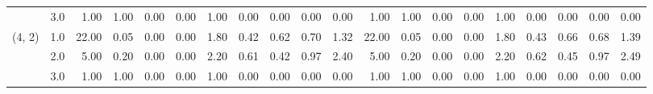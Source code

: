 \begin{tabular}{llrrrrrrrrrrrrrrrrrr}
       & 3.0 &               1.00 &                     1.00 &                                 0.00 &                             0.00 &                           1.00 &                                               0.00 &                                            0.00 &                                            0.00 &                                        0.00 &               1.00 &                     1.00 &                                 0.00 &                             0.00 &                           1.00 &                                               0.00 &                                            0.00 &                                            0.00 &                                        0.00 \\
(4, 2) & 1.0 &              22.00 &                     0.05 &                                 0.00 &                             0.00 &                           1.80 &                                               0.42 &                                            0.62 &                                            0.70 &                                        1.32 &              22.00 &                     0.05 &                                 0.00 &                             0.00 &                           1.80 &                                               0.43 &                                            0.66 &                                            0.68 &                                        1.39 \\
       & 2.0 &               5.00 &                     0.20 &                                 0.00 &                             0.00 &                           2.20 &                                               0.61 &                                            0.42 &                                            0.97 &                                        2.40 &               5.00 &                     0.20 &                                 0.00 &                             0.00 &                           2.20 &                                               0.62 &                                            0.45 &                                            0.97 &                                        2.49 \\
       & 3.0 &               1.00 &                     1.00 &                                 0.00 &                             0.00 &                           1.00 &                                               0.00 &                                            0.00 &                                            0.00 &                                        0.00 &               1.00 &                     1.00 &                                 0.00 &                             0.00 &                           1.00 &                                               0.00 &                                            0.00 &                                            0.00 &                                        0.00 \\

\end{tabular}
